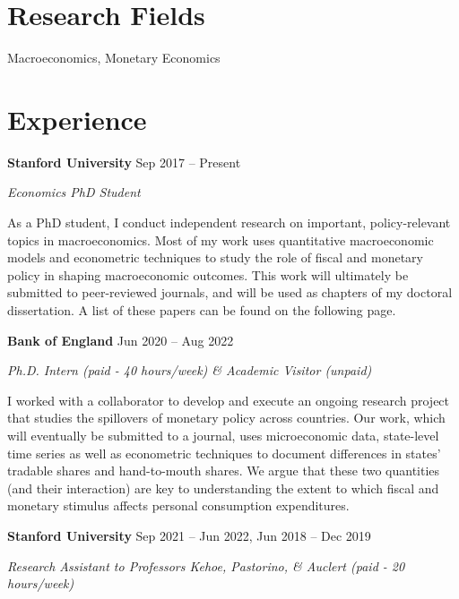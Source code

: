 \documentclass[margin,line]{res}                          %
\def\tinyskip{\vspace\tinyskipamount}
\newenvironment{list1}{
	\begin{list}{\ding{113}}{%
			\setlength{\itemsep}{0in}
			\setlength{\parsep}{0in} \setlength{\parskip}{0in}
			\setlength{\topsep}{0in} \setlength{\partopsep}{0in}
			\setlength{\leftmargin}{0.17in}}}{\end{list}}
\begin{document}
\begin{resume}
		\section{\sc Research Fields}%
	\begin{list1}
		\item[] Macroeconomics, Monetary Economics
	\end{list1}
	
	
	\section{\sc Experience}
	\begin{list1}
		\item[] \textbf{Stanford University} \hfill Sep 2017 -- Present \tinyskip
		\item[] \textit{Economics PhD Student}  \tinyskip
		\item[] As a PhD student, I conduct independent research on important, policy-relevant topics in macroeconomics. Most of my work uses quantitative macroeconomic models and econometric techniques to study the role of fiscal and monetary policy in shaping macroeconomic outcomes. This work will ultimately be submitted to peer-reviewed journals, and will be used as chapters of my doctoral dissertation. A list of these papers can be found on the following page.
		\medskip
		\item[] \textbf{Bank of England}  \hfill Jun 2020 -- Aug 2022\tinyskip
		\item[] \textit{Ph.D. Intern (paid - 40 hours/week)  \& Academic Visitor (unpaid)}\tinyskip
		\item[] I worked with a collaborator to develop and execute an ongoing research project that studies the spillovers of monetary policy across countries. Our work, which will eventually be submitted to a journal, uses microeconomic data, state-level time series as well as econometric techniques to document differences in states' tradable shares and hand-to-mouth shares. We argue that these two quantities (and their interaction) are key to understanding the extent to which fiscal and monetary stimulus affects personal consumption expenditures.
		\medskip
		\item[] \textbf{Stanford University} \hfill Sep 2021 -- Jun 2022, Jun 2018 -- Dec 2019 \tinyskip
		\item[] \textit{{Research Assistant to Professors Kehoe, Pastorino, \& Auclert} (paid - 20 hours/week)}\tinyskip

\end{list1}
\end{resume}
\end{document}
